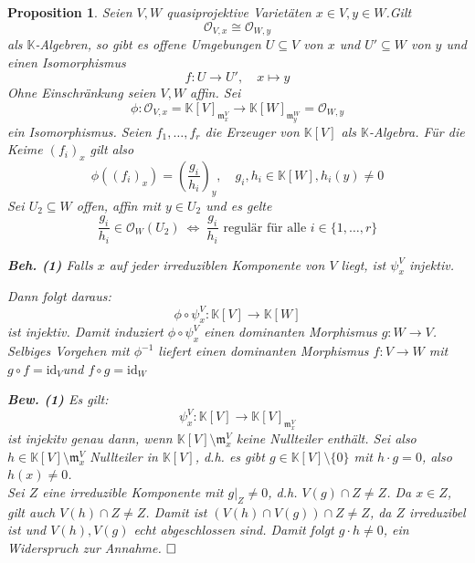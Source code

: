 \documentclass[11pt]{book}
\newtheorem{prop}[theorem]{Proposition}
\theoremstyle{nonumberbreak}
\newenvironment{pr}[1][]{\ifthenelse{\equal{#1}{}}{\proof}{\proof[#1]}\rm}{\endproof}
\begin{document}
\begin{spacing}{1.3}
\begin{prop}
Seien $V,W$ quasiprojektive Varietäten $x \in V, y \in W$.Gilt
$$\mathcal{O}_{V,x} \cong \mathcal{O}_{W, y}$$
als $\mathbb{K}$-Algebren, so gibt es offene Umgebungen $U \subseteq V$ von $x$ und $U' \subseteq W$ von $y$ und einen Isomorphismus
$$f: U \longrightarrow U', \quad x \mapsto y$$
\begin{pr}
Ohne Einschränkung seien $V,W$ affin. Sei 
$$\phi: \mathcal{O}_{V,x} = \mathbb{K}[V]_{\mathfrak{m}_x^V} \longrightarrow \mathbb{K}[W]_{\mathfrak{m}_y^W} = \mathcal{O}_{W,y}$$
ein Isomorphismus. Seien $f_1, \ldots, f_r$ die Erzeuger von $\mathbb{K}[V]$ als $\mathbb{K}$-Algebra. Für die Keime $(f_i)_x$ gilt also
$$\phi \left( (f_i)_x\right) = \left(\frac{g_i}{h_i}\right)_y, \quad g_i, h_i \in \mathbb{K}[W], h_i(y) \neq 0$$
Sei $U_2 \subseteq W$ offen, affin mit $y \in U_2$ und es gelte
$$\frac{g_i}{h_i} \in \mathcal{O}_W(U_2) \ \Longleftrightarrow \ \frac{g_i}{h_i} \textrm{ regulär für alle } i \in \{1, \ldots, r \}$$
\begin{compactenum}
\item[\textbf{Beh. (1)}] Falls $x$ auf jeder irreduziblen Komponente von $V$ liegt, ist $\psi_x^V$ injektiv.\end{compactenum}
Dann folgt daraus:
$$\phi \circ \psi_x^V: \mathbb{K}[V] \longrightarrow \mathbb{K}[W]$$
ist injektiv. Damit induziert $\phi \circ \psi_x^V$ einen dominanten Morphismus $g: W \longrightarrow V$. Selbiges Vorgehen mit $\phi^{-1}$ liefert einen dominanten Morphismus $f: V \longrightarrow W$ mit $g \circ f = \textrm{id}_V$und $ f \circ g = \textrm{id}_W$
\begin{compactenum}
\item[\textbf{Bew. (1)}] 
Es gilt:
$$\psi_x^V: \mathbb{K}[V]\longrightarrow \mathbb{K}[V]_{\mathfrak{m}_x^V}$$
ist injekitv genau dann, wenn $\mathbb{K}[V] \setminus \mathfrak{m}_x^V$ keine Nullteiler enthält. Sei also $ h \in \mathbb{K}[V] \setminus \mathfrak{m}_x^V$ Nullteiler in $\mathbb{K}[V]$, d.h. es gibt $g \in \mathbb{K}[V] \setminus \{0\} $ mit $h \cdot g = 0$, also $h(x) \neq 0$.\\
Sei $Z$ eine irreduzible Komponente mit $g \vert_Z \neq 0$, d.h. $V(g) \cap Z \neq Z$. Da $ x \in Z$, gilt auch $V(h) \cap Z \neq Z$. 
Damit ist $( V(h) \cap V(g)) \cap Z \neq Z$, da $Z$ irreduzibel ist und $V(h), V(g)$ echt abgeschlossen sind. Damit folgt $g \cdot h \neq 0$, ein Widerspruch zur Annahme. $\hfill \Box$
\end{compactenum}
\end{pr}
\end{prop}





\end{spacing}
\end{document}

